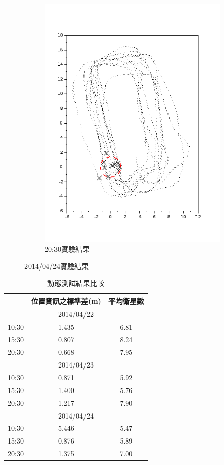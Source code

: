 \begin{figure}[h!]
\begin{subfigure}[t]{0.32\textwidth}
		\includegraphics[width=\textwidth]{figures/appendix1/dynamic_9}
		\caption{20:30實驗結果}
		\label{f:app:dynamic_9}
	\end{subfigure}
	\caption{2014/04/24實驗結果}
\end{figure}

\begin{table}[h!]
	\centering
	\caption{動態測試結果比較}
	\label{t:app:dynamic_result}
	\begin{tabular}{| l | c | c |}
		\hline
		 	& 位置資訊之標準差(m)	& 平均衛星數 \\ \hline
		\multicolumn{3}{|c|}{2014/04/22} \\ \hline
		10:30	& 1.435			& 6.81 \\ \hline
		15:30	& 0.807			& 8.24 \\ \hline
		20:30	& 0.668			& 7.95 \\ \hline
		\hline
		\multicolumn{3}{|c|}{2014/04/23} \\ \hline
		10:30	& 0.871			& 5.92 \\ \hline
		15:30	& 1.400			& 5.76 \\ \hline
		20:30	& 1.217			& 7.90 \\ \hline
		\hline
		\multicolumn{3}{|c|}{2014/04/24} \\ \hline
		10:30	& 5.446			& 5.47 \\ \hline
		15:30	& 0.876			& 5.89 \\ \hline
		20:30	& 1.375			& 7.00 \\
		\hline
	\end{tabular}
\end{table}


